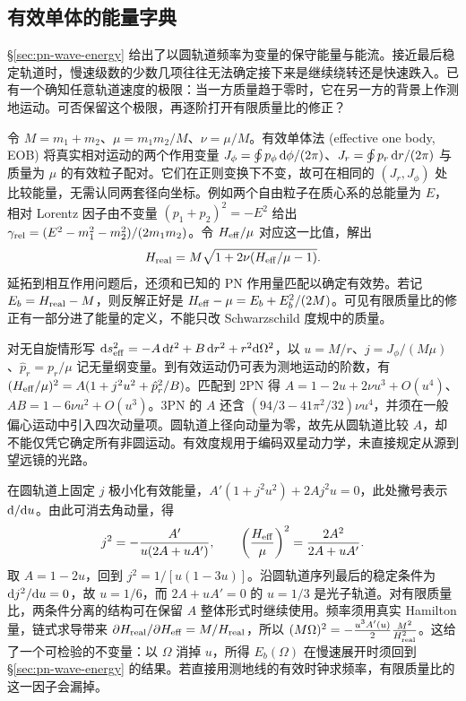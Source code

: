 \subsection{有效单体的能量字典}

\S\ref{sec:pn-wave-energy} 给出了以圆轨道频率为变量的保守能量与能流。接近最后稳定轨道时，慢速级数的少数几项往往无法确定接下来是继续绕转还是快速跌入。已有一个确知任意轨道速度的极限：当一方质量趋于零时，它在另一方的背景上作测地运动。可否保留这个极限，再逐阶打开有限质量比的修正？

令 $M=m_1+m_2$、$\mu=m_1m_2/M$、$\nu=\mu/M$。有效单体法 (effective one body, EOB) 将真实相对运动的两个作用变量 $J_\phi=\oint p_\phi\,\dd\phi/(2\pi)$、$J_r=\oint p_r\,\dd r/(2\pi)$ 与质量为 $\mu$ 的有效粒子配对。它们在正则变换下不变，故可在相同的 $(J_r,J_\phi)$ 处比较能量，无需认同两套径向坐标。例如两个自由粒子在质心系的总能量为 $E$，相对 Lorentz 因子由不变量 $(p_1+p_2)^2=-E^2$ 给出 $\gamma_{\rm rel}=(E^2-m_1^2-m_2^2)/(2m_1m_2)$。令 $H_{\rm eff}/\mu$ 对应这一比值，解出
\begin{equation}
 H_{\rm real}=M\sqrt{1+2\nu(H_{\rm eff}/\mu-1)} .
 \label{eq:gw-ceob}
\end{equation}
延拓到相互作用问题后，还须和已知的 PN 作用量匹配以确定有效势。若记 $E_b=H_{\rm real}-M$，则反解正好是 $H_{\rm eff}-\mu=E_b+E_b^2/(2M)$。可见有限质量比的修正有一部分进了能量的定义，不能只改 Schwarzschild 度规中的质量。

对无自旋情形写 $\dd s_{\rm eff}^2=-A\,\dd t^2+B\,\dd r^2+r^2\dd\Omega^2$，以 $u=M/r$、$j=J_\phi/(M\mu)$、$\hat p_r=p_r/\mu$ 记无量纲变量。到有效运动仍可表为测地运动的阶数，有 $(H_{\rm eff}/\mu)^2=A(1+j^2u^2+\hat p_r^2/B)$。匹配到 2PN 得 $A=1-2u+2\nu u^3+O(u^4)$、$A B=1-6\nu u^2+O(u^3)$。3PN 的 $A$ 还含 $(94/3-41\pi^2/32)\nu u^4$，并须在一般偏心运动中引入四次动量项。圆轨道上径向动量为零，故先从圆轨道比较 $A$，却不能仅凭它确定所有非圆运动。有效度规用于编码双星动力学，未直接规定从源到望远镜的光路。

在圆轨道上固定 $j$ 极小化有效能量，$A'(1+j^2u^2)+2A j^2u=0$，此处撇号表示 $\dd/\dd u$。由此可消去角动量，得
\[
 j^2=-\frac{A'}{u(2A+uA')},\qquad
 \left(\frac{H_{\rm eff}}{\mu}\right)^2=\frac{2A^2}{2A+uA'}.
\]
取 $A=1-2u$，回到 $j^2=1/[u(1-3u)]$。沿圆轨道序列最后的稳定条件为 $\dd j^2/\dd u=0$，故 $u=1/6$，而 $2A+uA'=0$ 的 $u=1/3$ 是光子轨道。对有限质量比，两条件分离的结构可在保留 $A$ 整体形式时继续使用。频率须用真实 Hamilton 量，链式求导带来 $\partial H_{\rm real}/\partial H_{\rm eff}=M/H_{\rm real}$，所以 $(M\Omega)^2=-\frac{u^3 A'(u)}{2}\frac{M^2}{H_{\rm real}^2}$。这给了一个可检验的不变量：以 $\Omega$ 消掉 $u$，所得 $E_b(\Omega)$ 在慢速展开时须回到 \S\ref{sec:pn-wave-energy} 的结果。若直接用测地线的有效时钟求频率，有限质量比的这一因子会漏掉。

